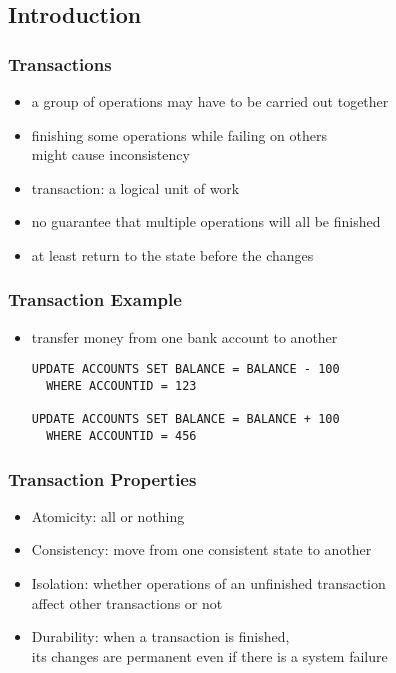 \documentclass[dvipsnames]{beamer}
\theoremstyle{plain}
\begin{document}
\subsection{Introduction}

\begin{frame}
  \frametitle{Transactions}

  \begin{itemize}
    \item a group of operations may have to be carried out together
    \item finishing some operations while failing on others\\
      might cause inconsistency
    \item \alert{transaction}: a logical unit of work

    \pause
    \medskip
    \item no guarantee that multiple operations will all be finished
    \item at least return to the state before the changes
  \end{itemize}
\end{frame}

\begin{frame}[fragile]
  \frametitle{Transaction Example}

  \begin{itemize}
    \item transfer money from one bank account to another

    \medskip
    \begin{lstlisting}
UPDATE ACCOUNTS SET BALANCE = BALANCE - 100
  WHERE ACCOUNTID = 123

UPDATE ACCOUNTS SET BALANCE = BALANCE + 100
  WHERE ACCOUNTID = 456
    \end{lstlisting}
  \end{itemize}
\end{frame}

\begin{frame}
  \frametitle{Transaction Properties}

  \begin{itemize}
    \item \alert{A}tomicity: all or nothing

    \pause
    \medskip
    \item \alert{C}onsistency: move from one consistent state to another

    \pause
    \medskip
    \item \alert{I}solation: whether operations of an unfinished transaction\\
      affect other transactions or not

    \pause
    \medskip
    \item \alert{D}urability: when a transaction is finished,\\
      its changes are permanent even if there is a system failure
  \end{itemize}
\end{frame}
\end{document}
